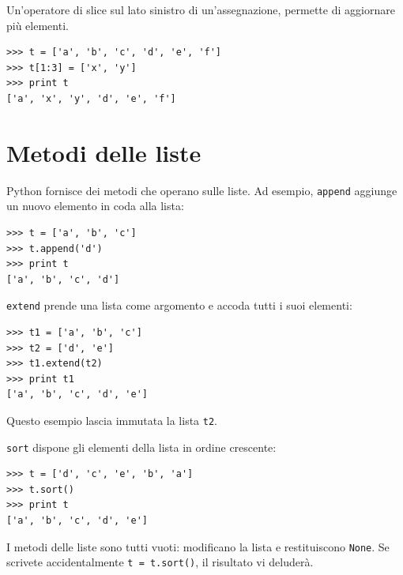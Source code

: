 \documentclass[10pt]{book}
\begin{document}
Un'operatore di slice sul lato sinistro di un'assegnazione, permette di aggiornare più elementi.

\begin{verbatim}
>>> t = ['a', 'b', 'c', 'd', 'e', 'f']
>>> t[1:3] = ['x', 'y']
>>> print t
['a', 'x', 'y', 'd', 'e', 'f']
\end{verbatim}
%


%

%


\section{Metodi delle liste}

Python fornisce dei metodi che operano sulle liste. Ad esempio,
{\tt append} aggiunge un nuovo elemento in coda alla lista:

\begin{verbatim}
>>> t = ['a', 'b', 'c']
>>> t.append('d')
>>> print t
['a', 'b', 'c', 'd']
\end{verbatim}
%
{\tt extend} prende una lista come argomento e accoda tutti i suoi elementi:

\begin{verbatim}
>>> t1 = ['a', 'b', 'c']
>>> t2 = ['d', 'e']
>>> t1.extend(t2)
>>> print t1
['a', 'b', 'c', 'd', 'e']
\end{verbatim}
%
Questo esempio lascia immutata la lista {\tt t2}.

{\tt sort} dispone gli elementi della lista in ordine crescente:

\begin{verbatim}
>>> t = ['d', 'c', 'e', 'b', 'a']
>>> t.sort()
>>> print t
['a', 'b', 'c', 'd', 'e']
\end{verbatim}
%
I metodi delle liste sono tutti vuoti: modificano la lista e restituiscono {\tt None}. Se scrivete accidentalmente  {\tt t = t.sort()}, il risultato vi deluderà.
\end{document}

